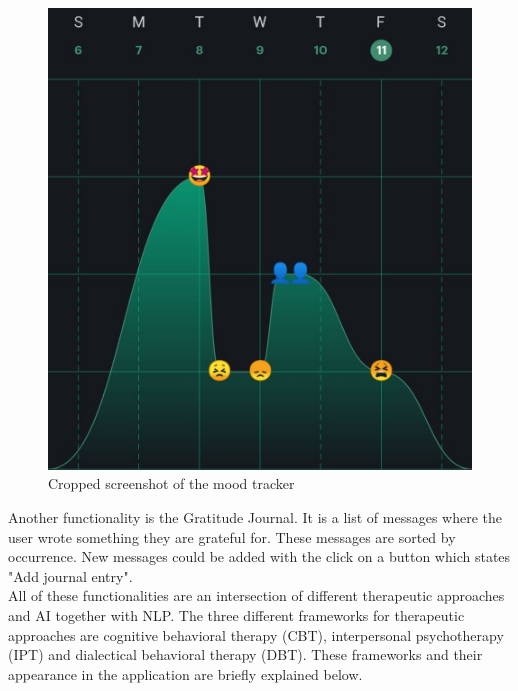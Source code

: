 \begin{figure}[ht]
  \begin{center}
    \includegraphics[width=1\columnwidth]{files/moodtracker.png}
    \caption{\label{fig:moodtracker} Cropped screenshot of the mood tracker}
  \end{center}
\end{figure}

Another functionality is the Gratitude Journal.
It is a list of messages where the user wrote something they are grateful for.
These messages are sorted by occurrence.
New messages could be added with the click on a button which states "Add journal entry".\\

All of these functionalities are an intersection of different therapeutic approaches and AI together with NLP\cite{woebot-powers}.
The three different frameworks for therapeutic approaches are cognitive behavioral therapy (CBT), interpersonal psychotherapy (IPT) and dialectical behavioral therapy (DBT).
These frameworks and their appearance in the application are briefly explained below.\\

